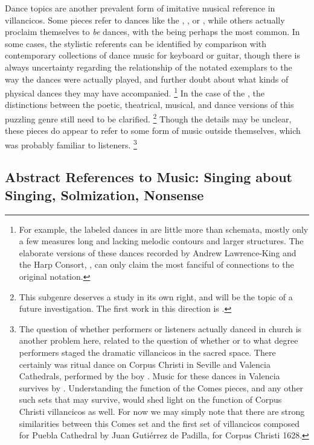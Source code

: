 Dance topics are another prevalent form of imitative musical reference in villancicos.
Some pieces refer to dances like the , , or , while others actually proclaim themselves to \emph{be} dances, with the  being perhaps the most common.
In some cases, the stylistic referents can be identified by comparison with contemporary collections of dance music for keyboard or guitar, though there is always uncertainty regarding the relationship of the notated exemplars to the way the dances were actually played, and further doubt about what kinds of physical dances they may have accompanied.%
	\footnote{%
	For example, the labeled dances in  are little more than schemata, mostly only a few measures long and lacking melodic contours and larger structures.
	The elaborate versions of these dances recorded by Andrew Lawrence-King and the Harp Consort, , can only claim the most fanciful of connections to the original notation.
	}
In the case of the , the distinctions between the poetic, theatrical, musical, and dance versions of this puzzling genre still need to be clarified.%
	\footnote{%
	This subgenre deserves a study in its own right, and will be the topic of a future investigation. 
	The first work in this direction is \autocite{Torrente:Jacara}.
	}
Though the details may be unclear, these pieces do appear to refer to some form of music outside themselves, which was probably familiar to listeners.%
	\footnote{%
	The question of whether performers or listeners actually danced in church is another problem here, related to the question of whether or to what degree performers staged the dramatic villancicos in the sacred space.
	There certainly was ritual dance on Corpus Christi in Seville and Valencia Cathedrals, performed by the boy .
	Music for these dances in Valencia survives by \autocite{Comes:Danzas}.
	Understanding the function of the Comes pieces, and any other such sets that may survive, would shed light on the function of Corpus Christi villancicos as well.
	For now we may simply note that there are strong similarities between this Comes set and the first set of villancicos composed for Puebla Cathedral by Juan Gutiérrez de Padilla, for Corpus Christi 1628.
	}

\subsection{%
Abstract References to Music: Singing about Singing, Solmization, Nonsense
}

